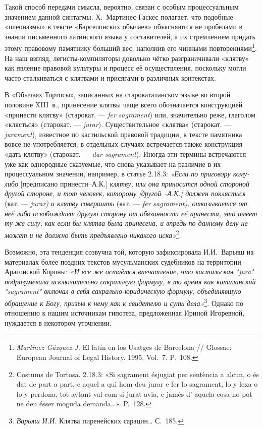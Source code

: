 Такой способ передачи смысла, вероятно, связан с особым процессуальным значением данной синтагмы. Х.~Мартинес-Гаскес полагает, что подобные «плеоназмы» в тексте «Барселонских обычаев» объясняются не пробелами в знании письменного латинского языка у составителей, а их стремлением придать этому правовому памятнику больший вес, наполнив его чинными повторениями\footnote{\emph{Martínez Gázquez J.} El latín en los Usatges de Barcelona // Glossae: European Journal of Legal History. 1995. Vol.~7. P.~108.}. На наш взгляд, легисты-компиляторы довольно чётко разграничивали «клятву» как явление правовой культуры и процесс её осуществления, поскольку могли часто сталкиваться с клятвами и присягами в различных контекстах.

В «Обычаях Тортосы», записанных на старокаталанском языке во второй половине XIII~в., принесение клятвы чаще всего обозначается конструкцией «принести клятву» (старокат. --- \emph{fer}\emph{ }\emph{sagrament}) или, значительно реже, глаголом «клясться» (старокат. --- \emph{jurar}). Существительное «клятва» (старокат. --- \emph{jurament}), известное по кастильской правовой традиции, в тексте памятника вовсе не употребляется; в отдельных случаях встречается также конструкция «дать клятву» (старокат. --- \emph{dar}\emph{ }\emph{sagrament}). Иногда эти термины встречаются уже как однородные сказуемые, что снова указывает на различие в их процессуальном значении, например, в статье 2.18.3:\emph{ «Если по приговору кому-либо }[предписано принести--А.К.]\emph{ клятву, или она приносится одной стороной другой стороне, и тот человек, которому [другой --А.К.] должен поклясться }(кат. --- \emph{jurar}\emph{) и клятву совершить }(кат. ---\emph{ }\emph{fer}\emph{ }\emph{sagrament}\emph{), отказывается от неё либо освобождает другую сторону от обязанности её принести, это имеет ту же силу, как если бы клятва была принесена, и впредь по данному делу не может и не должно быть предъявлено никакого иска»}\footnote{Costums de Tortosa. 2.18.3: «Si sagrament ésjugiat per sentència a alcun, o és dat de part a part, e aquel a qui hom deu jurar e fer lo sagrament, lo y lexa o lo y perdona, tot aytant val com si jurat avia, e jamés d' aquela cosa no pot ne deu ésser moguda demanda…». P.~128.}.

Возможно, эта тенденция созвучна той, которую зафиксировала И.И.~Варьяш на материалах более поздних текстов мусульманских судебников на территории Арагонской Короны: \emph{«И все же остаётся впечатление, что кастильская "}\emph{jura}\emph{" подразумевала исключительно сакральную формулу, в то время как каталанский "}\emph{sagrament}\emph{" включал в себя сакрально-юридическую формулу, объединявшую обращение к Богу, призыв к нему как к свидетелю и суть дела»}\footnote{\emph{ }\emph{Варьяш}\emph{ И.И. }Клятва пиренейских сарацин… С.~185.}. Однако по отношению к нашим источникам гипотеза, предложенная Ириной Игоревной, нуждается в некотором уточнении.

